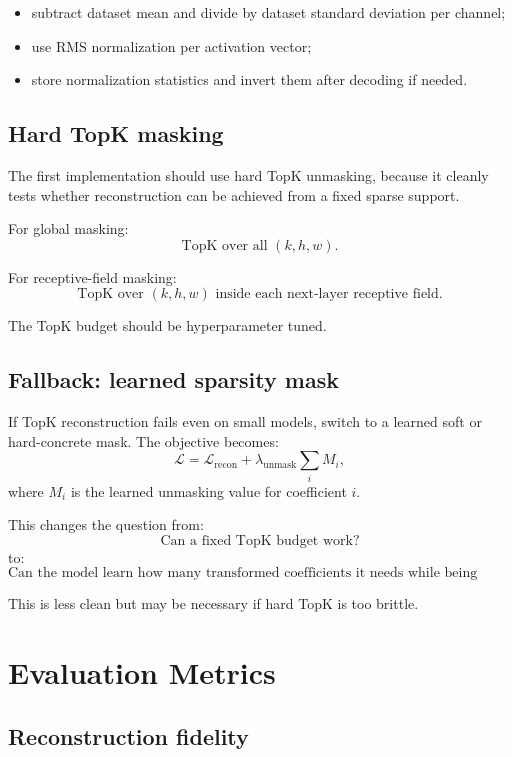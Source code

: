 \documentclass[11pt]{article}
\begin{document}
\begin{itemize}[leftmargin=*]
    \item subtract dataset mean and divide by dataset standard deviation per channel;
    \item use RMS normalization per activation vector;
    \item store normalization statistics and invert them after decoding if needed.
\end{itemize}

\subsection{Hard TopK masking}

The first implementation should use hard TopK unmasking, because it cleanly tests whether reconstruction can be achieved from a fixed sparse support.

For global masking:
\[
\text{TopK over all } (k,h,w).
\]

For receptive-field masking:
\[
\text{TopK over } (k,h,w) \text{ inside each next-layer receptive field.}
\]

The TopK budget should be hyperparameter tuned.

\subsection{Fallback: learned sparsity mask}

If TopK reconstruction fails even on small models, switch to a learned soft or hard-concrete mask. The objective becomes:
\[
\mathcal{L}
=
\mathcal{L}_{\mathrm{recon}}
+
\lambda_{\mathrm{unmask}}
\sum_i M_i,
\]
where \(M_i\) is the learned unmasking value for coefficient \(i\).

This changes the question from:
\[
\text{Can a fixed TopK budget work?}
\]
to:
\[
\text{Can the model learn how many transformed coefficients it needs while being penalized for unmasking too many?}
\]

This is less clean but may be necessary if hard TopK is too brittle.

\section{Evaluation Metrics}

\subsection{Reconstruction fidelity}
\end{document}

